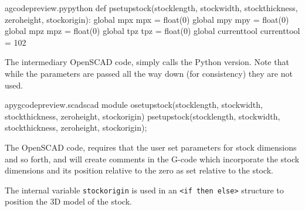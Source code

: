 \documentclass{ltxdoc}
\begin{document}
\lstset{firstnumber=\thegcpy}
\begin{writecode}{a}{gcodepreview.py}{python}
def psetupstock(stocklength, stockwidth, stockthickness, zeroheight, stockorigin):
    global mpx
    mpx = float(0)
    global mpy
    mpy = float(0)
    global mpz
    mpz = float(0)
    global tpz
    tpz = float(0)
    global currenttool
    currenttool = 102

\end{writecode}
\addtocounter{gcpy}{12}

The intermediary OpenSCAD code,  simply 
calls the Python version. Note that while the parameters are passed all the way down 
(for consistency) they are not used.

\lstset{firstnumber=\thepyscad}
\begin{writecode}{a}{pygcodepreview.scad}{scad}
 module osetupstock(stocklength, stockwidth, stockthickness, zeroheight, stockorigin) {
     psetupstock(stocklength, stockwidth, stockthickness, zeroheight, stockorigin);
 }
 
\end{writecode}
\addtocounter{pyscad}{4}

The OpenSCAD code,  requires that the user set parameters
for stock dimensions and so forth, and will create comments in the G-code which incorporate 
the stock dimensions and its position relative to the zero as set relative to the stock.
 
The internal variable \verb|stockorigin| is used in an \verb|<if then else>| structure to position
the 3D model of the stock. 
\end{document}
